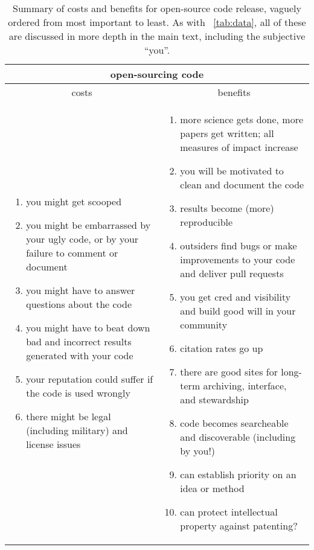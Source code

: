 \documentclass[12pt,twoside,pdftex]{article}
\begin{document}
\begin{table}%
\begin{tabular}{@{}p{\cwidth}|p{\cwidth}@{}}%
\multicolumn{2}{c}{\textbf{open-sourcing code}} \\ \hline
\multicolumn{1}{c|}{costs} & \multicolumn{1}{c}{benefits} \\ \hline
\begin{enumerate}\raggedright
\item you might get scooped
\item you might be embarrassed by your ugly code, or by your failure to comment or document
\item you might have to answer questions about the code
\item you might have to beat down bad and incorrect results generated with your code
\item your reputation could suffer if the code is used wrongly
\item there might be legal (including military) and license issues
\end{enumerate}&\begin{enumerate}\raggedright
\item more science gets done, more papers get written; all measures of impact increase
\item you will be motivated to clean and document the code
\item results become (more) reproducible
\item outsiders find bugs or make improvements to your code and deliver pull requests
\item you get cred and visibility and build good will in your community
\item citation rates go up
\item there are good sites for long-term archiving, interface, and stewardship
\item code becomes searcheable and discoverable (including by you!)
\item can establish priority on an idea or method
\item can protect intellectual property against patenting?
\end{enumerate}\end{tabular}
\caption{Summary of costs and benefits for open-source code release,
  vaguely ordered from most important to least. As with
  \tablename~\ref{tab:data}, all of these are discussed in more depth
  in the main text, including the subjective ``you''.\label{tab:code}}
\end{table}
\end{document}
